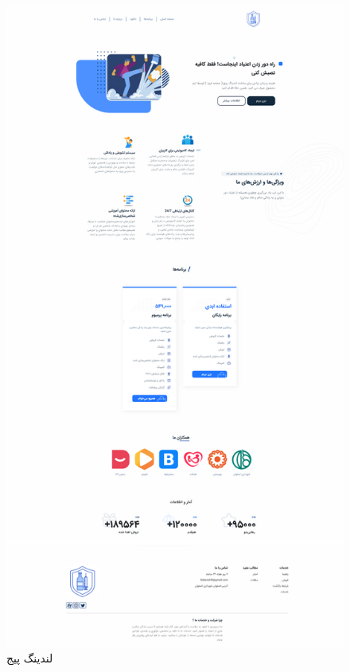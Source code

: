 \documentclass[dvipsnames, svgnames, x11names, 11pt]{article}
\begin{document}
\begin{figure}[b]
\begin{center}
\includegraphics[scale=0.2]{images/landing}
\end{center}
\caption{لندینگ پیج}
\label{fig:landing-page}
\end{figure}
\end{document}
